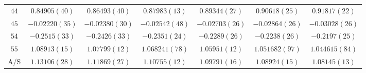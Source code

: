 \begin{table}
\begin{center}
\begin{tabular}{c|c c c c c c}
$44$ & $0.84905(40)$ & $0.86493(40)$ & $0.87983(13)$ & $0.89344(27)$ & $0.90618(25)$ & $0.91817(22)$ \\
$45$ & $-0.02220(35)$ & $-0.02380(30)$ & $-0.02542(48)$ & $-0.02703(26)$ & $-0.02864(26)$ & $-0.03028(26)$ \\
$54$ & $-0.2515(33)$ & $-0.2426(33)$ & $-0.2351(24)$ & $-0.2289(26)$ & $-0.2238(26)$ & $-0.2197(25)$ \\
$55$ & $1.08913(15)$ & $1.07799(12)$ & $1.068241(78)$ & $1.05951(12)$ & $1.051682(97)$ & $1.044615(84)$ \\
\hline
A/S & $1.13106(28)$ & $1.11869(27)$ & $1.10755(12)$ & $1.09791(16)$ & $1.08924(15)$ & $1.08145(13)$ \\
\hline
\hline
\end{tabular}
\end{center}
\end{table}